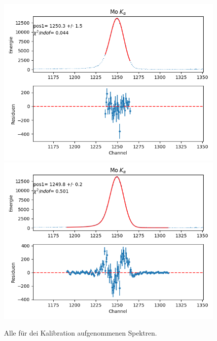 \documentclass[12pt,a4paper]{article}
\begin{document}
\begin{figure}[H]
\centering
\includegraphics[scale=0.8]{Bilder/alpha/mo_alpha_1.png}
\includegraphics[scale=0.8]{Bilder/alpha/mo_alpha_2.png}
\caption{Alle für dei Kalibration aufgenommenen Spektren.}
\label{fig:kal_alles}
\end{figure}
\end{document}
